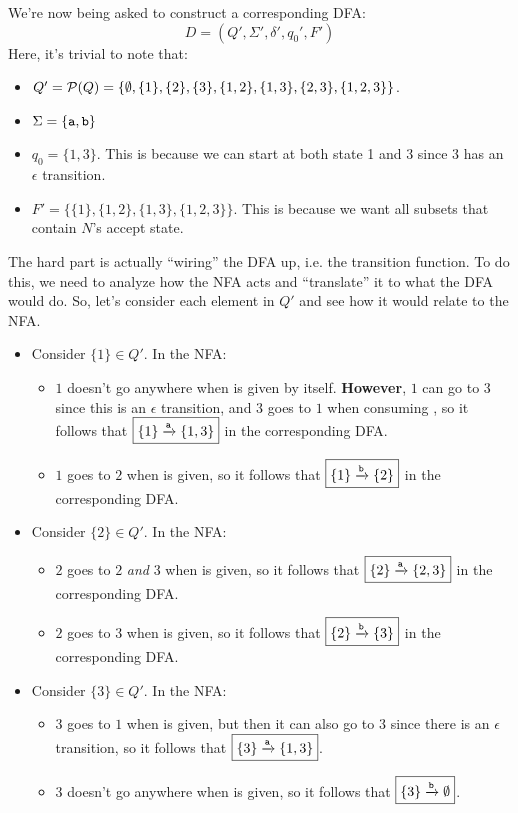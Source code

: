 \documentclass[letterpaper]{article}
\begin{document}
We're now being asked to construct a corresponding DFA: 
\[D = (Q', \Sigma', \delta', q_0', F')\]
Here, it's trivial to note that: 
\begin{itemize}
    \item $Q' = \mathcal{P}(Q) = \{\emptyset, \{1\}, \{2\}, \{3\}, \{1, 2\}, \{1, 3\}, \{2, 3\}, \{1, 2, 3\}\}$. 
    \item $\Sigma = \{\texttt{a}, \texttt{b}\}$
    \item $q_0 = \{1, 3\}$. This is because we can start at both state 1 and 3 since 3 has an $\epsilon$ transition.
    \item $F' = \{\{1\}, \{1, 2\}, \{1, 3\}, \{1, 2, 3\}\}$. This is because we want all subsets that contain $N$'s accept state. 
\end{itemize}
The hard part is actually ``wiring'' the DFA up, i.e. the transition function. To do this, we need to analyze how the NFA acts and ``translate'' it to what the DFA would do. So, let's consider each element in $Q'$ and see how it would relate to the NFA. 
\begin{itemize}
    \item Consider $\{1\} \in Q'$. In the NFA:
    \begin{itemize}
        \item $1$ doesn't go anywhere when  is given by itself. \textbf{However}, $1$ can go to $3$ since this is an $\epsilon$ transition, and $3$ goes to $1$ when consuming , so it follows that $\boxed{\{1\} \xrightarrow{\texttt{a}} \{1, 3\}}$ in the corresponding DFA. 
        \item $1$ goes to $2$ when  is given, so it follows that $\boxed{\{1\} \xrightarrow[]{\texttt{b}} \{2\}}$ in the corresponding DFA. 
    \end{itemize}
    \item Consider $\{2\} \in Q'$. In the NFA: 
    \begin{itemize}
        \item $2$ goes to $2$ \emph{and} $3$ when  is given, so it follows that $\boxed{\{2\} \xrightarrow{\texttt{a}} \{2, 3\}}$ in the corresponding DFA. 
        \item $2$ goes to $3$ when  is given, so it follows that $\boxed{\{2\} \xrightarrow[]{\texttt{b}} \{3\}}$ in the corresponding DFA. 
    \end{itemize}
    \item Consider $\{3\} \in Q'$. In the NFA: 
    \begin{itemize}
        \item $3$ goes to $1$ when  is given, but then it can also go to $3$ since there is an $\epsilon$ transition, so it follows that $\boxed{\{3\} \xrightarrow{\texttt{a}} \{1, 3\}}$. 
        \item $3$ doesn't go anywhere when  is given, so it follows that $\boxed{\{3\} \xrightarrow{\texttt{b}} \emptyset}$.
    \end{itemize}
\end{itemize}
\end{document}
